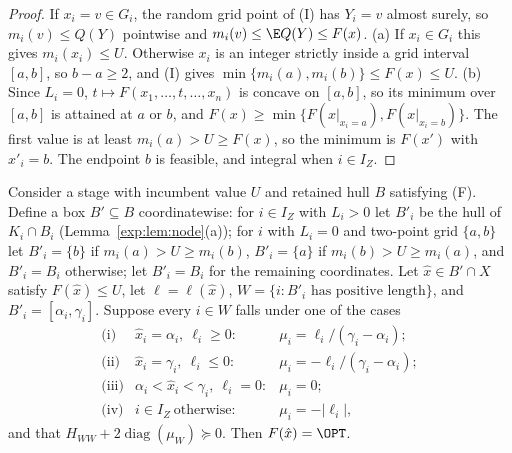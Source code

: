 \begin{proof}
If $x_i=v\in G_i$, the random grid point of (I) has $Y_i=v$ almost surely,
so $m_i(v)\le Q(Y)$ pointwise and $m_i(v)\le\E Q(Y)\le F(x)$.
(a) If $x_i\in G_i$ this gives $m_i(x_i)\le U$. Otherwise $x_i$ is an
integer strictly inside a grid interval $[a,b]$, so $b-a\ge2$, and (I) gives
$\min\{m_i(a),m_i(b)\}\le F(x)\le U$.
(b) Since $L_i=0$, $t\mapsto F(x_1,\dots,t,\dots,x_n)$ is concave on
$[a,b]$, so its minimum over $[a,b]$ is attained at $a$ or $b$, and
$F(x)\ge\min\{F(x|_{x_i=a}),F(x|_{x_i=b})\}$. The first value is at least
$m_i(a)>U\ge F(x)$, so the minimum is $F(x')$ with $x'_i=b$. The endpoint
$b$ is feasible, and integral when $i\in I_Z$.
\end{proof}

\begin{proposition}\label{exp:prop:local}
Consider a stage with incumbent value $U$ and retained hull $B$ satisfying
(F). Define a box $B'\subseteq B$ coordinatewise: for $i\in I_Z$ with
$L_i>0$ let $B'_i$ be the hull of $K_i\cap B_i$ (Lemma~\ref{exp:lem:node}(a));
for $i$ with $L_i=0$ and two-point grid $\{a,b\}$ let $B'_i=\{b\}$ if
$m_i(a)>U\ge m_i(b)$, $B'_i=\{a\}$ if $m_i(b)>U\ge m_i(a)$, and $B'_i=B_i$
otherwise; let $B'_i=B_i$ for the remaining coordinates. Let
$\hat x\in B'\cap X$ satisfy $F(\hat x)\le U$, let $\ell=\ell(\hat x)$,
$W=\{i:B'_i\text{ has positive length}\}$, and $B'_i=[\alpha_i,\gamma_i]$.
Suppose every $i\in W$ falls under one of the cases
\[
\begin{array}{lll}
\text{(i)}&\hat x_i=\alpha_i,\ \ell_i\ge0:&\mu_i=\ell_i/(\gamma_i-\alpha_i);\\
\text{(ii)}&\hat x_i=\gamma_i,\ \ell_i\le0:&\mu_i=-\ell_i/(\gamma_i-\alpha_i);\\
\text{(iii)}&\alpha_i<\hat x_i<\gamma_i,\ \ell_i=0:&\mu_i=0;\\
\text{(iv)}&i\in I_Z\ \text{otherwise}:&\mu_i=-|\ell_i|,
\end{array}
\]
and that $H_{WW}+2\operatorname{diag}(\mu_W)\succeq0$. Then $F(\hat x)=\OPT$.
\end{proposition}

